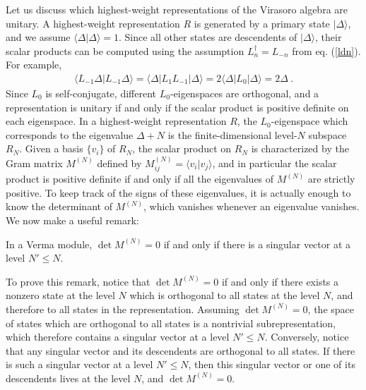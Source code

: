 \documentclass[12pt,a4paper,notitlepage]{report}
\numberwithin{equation}{section}
\theoremstyle{break}
\begin{document}
Let us discuss which highest-weight representations of the Virasoro algebra are unitary. A highest-weight representation $R$ is generated by a primary state $|\Delta\rangle$, and we assume $\langle \Delta|\Delta\rangle =1$. Since all other states are descendents of $|\Delta\rangle$, their scalar products can be computed using the assumption $L_n^\dagger = L_{-n}$ from eq. (\ref{ldn}). For example,
\begin{align}
 \langle L_{-1} \Delta|L_{-1}\Delta\rangle = \langle \Delta |L_1 L_{-1}|\Delta\rangle = 2\langle \Delta|L_0|\Delta\rangle = 2\Delta\ .  
\end{align}
Since $L_0$ is self-conjugate, different $L_0$-eigenspaces are orthogonal, and a representation is unitary if and only if the scalar product is positive definite on each eigenspace. 
In a highest-weight representation $R$, the $L_0$-eigenspace which corresponds to the eigenvalue $\Delta+N$ is the finite-dimensional level-$N$ subspace $R_N$. Given a basis $\{v_i\}$ of $R_N$, the scalar product on $R_N$ is characterized by the Gram matrix $M^{(N)}$ defined by $M^{(N)}_{ij}=\langle v_i|v_j\rangle$, and in particular the scalar product is positive definite if and only if all the eigenvalues of $M^{(N)}$ are strictly positive. To keep track of the signs of these eigenvalues, it is actually enough to know the determinant of $M^{(N)}$, which vanishes whenever an eigenvalue vanishes. 
We now make a useful remark:
\begin{center}
 \begin{minipage}{0.9\textwidth}
 In a Verma module, $\det M^{(N)}=0$ if and only if there is a singular vector at a level $N'\leq N$.  
 \end{minipage}
\end{center}
To prove this remark, notice that $\det M^{(N)}=0$ if and only if there exists a nonzero state at the level $N$ which is orthogonal to all states at the level $N$, and therefore to all states in the representation. Assuming $\det M^{(N)}=0$, the space of states which are orthogonal to all states is a nontrivial subrepresentation, which therefore contains a singular vector at a level $N'\leq N$. 
Conversely, notice that any singular vector and its descendents are orthogonal to all states. If there is such a singular vector at a level $N'\leq N$, then this singular vector or one of its descendents lives at the level $N$, and $\det M^{(N)}=0$.
\end{document}
